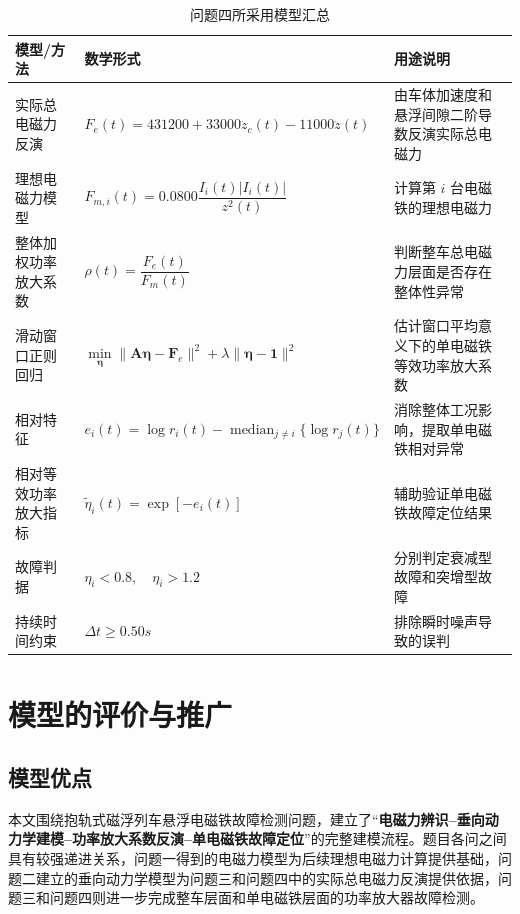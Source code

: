 \documentclass[a4paper]{nmmcm}
\begin{document}
\FloatBarrier
\begin{table}[H]
\centering
\caption{问题四所采用模型汇总}
\label{tab:q4_model_summary}
\footnotesize
\renewcommand{\arraystretch}{1.20}
\setlength{\tabcolsep}{3pt}
\begin{tabular}{@{}p{2.6cm} p{6.0cm} p{4.8cm}@{}}
\toprule
模型/方法 & 数学形式 & 用途说明 \\
\midrule
实际总电磁力反演
& $F_e(t)=431200+33000\ddot{z}_c(t)-11000\ddot{z}(t)$
& 由车体加速度和悬浮间隙二阶导数反演实际总电磁力 \\

理想电磁力模型
& $F_{m,i}(t)=0.0800\dfrac{I_i(t)|I_i(t)|}{z^2(t)}$
& 计算第 $i$ 台电磁铁的理想电磁力 \\

整体加权功率放大系数
& $\rho(t)=\dfrac{F_e(t)}{F_m(t)}$
& 判断整车总电磁力层面是否存在整体性异常 \\

滑动窗口正则回归
& $\min\limits_{\boldsymbol{\eta}}\|\mathbf{A}\boldsymbol{\eta}-\mathbf{F}_e\|^2+\lambda\|\boldsymbol{\eta}-\mathbf{1}\|^2$
& 估计窗口平均意义下的单电磁铁等效功率放大系数 \\

相对特征
& $e_i(t)=\log r_i(t)-\operatorname{median}_{j\neq i}\{\log r_j(t)\}$
& 消除整体工况影响，提取单电磁铁相对异常 \\

相对等效功率放大指标
& $\tilde{\eta}_i(t)=\exp[-e_i(t)]$
& 辅助验证单电磁铁故障定位结果 \\

故障判据
& $\eta_i<0.8,\quad \eta_i>1.2$
& 分别判定衰减型故障和突增型故障 \\

持续时间约束
& $\Delta t\geq0.50s$
& 排除瞬时噪声导致的误判 \\
\bottomrule
\end{tabular}
\end{table}
\FloatBarrier


\section{模型的评价与推广}

\subsection{模型优点}

本文围绕抱轨式磁浮列车悬浮电磁铁故障检测问题，建立了“\textbf{电磁力辨识--垂向动力学建模--功率放大系数反演--单电磁铁故障定位}”的完整建模流程。题目各问之间具有较强递进关系，问题一得到的电磁力模型为后续理想电磁力计算提供基础，问题二建立的垂向动力学模型为问题三和问题四中的实际总电磁力反演提供依据，问题三和问题四则进一步完成整车层面和单电磁铁层面的功率放大器故障检测。
\end{document}
